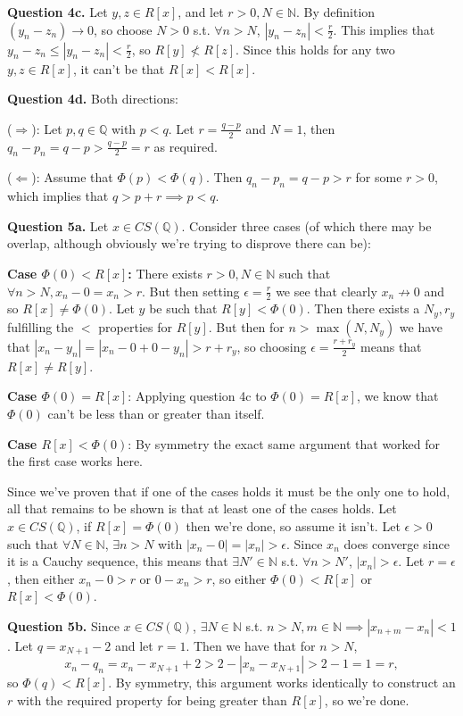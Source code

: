 \documentclass[letterpaper, reqno,11pt]{article}
\begin{document}
{\medskip\noindent\bf Question 4c.} Let $y,z\in R[x]$, and let $r>0,N\in \mathbb{N}$. By definition $(y_n-z_n)\to 0$, so choose $N>0$ s.t. $\forall n>N$, $|y_n-z_n|<\frac{r}{2}$. This implies that $y_n-z_n\leq |y_n-z_n|<\frac{r}{2}$, so $R[y]\not <R[z]$. Since this holds for any two $y,z\in R[x]$, it can't be that $R[x]<R[x]$.

{\medskip\noindent\bf Question 4d.} Both directions:

($\Rightarrow$): Let $p,q\in \mathbb{Q}$ with $p<q$. Let $r=\frac{q-p}{2}$ and $N=1$, then $q_n-p_n=q-p>\frac{q-p}{2}=r$ as required.

($\Leftarrow$): Assume that $\Phi(p)<\Phi(q)$. Then $q_n-p_n=q-p>r$ for some $r>0$, which implies that $q>p+r\implies p<q$.

\newpage\phantom{blabla}
\newpage

{\medskip\noindent\bf Question 5a.} Let $x\in CS(\mathbb{Q})$. Consider three cases (of which there may be overlap, although obviously we're trying to disprove there can be):

{\bf Case $\Phi(0)<R[x]$:} There exists $r>0,N\in \mathbb{N}$ such that $\forall n>N, x_n-0=x_n>r$. But then setting $\epsilon= \frac{r}{2}$ we see that clearly $x_n\not\to 0$ and so $R[x]\neq \Phi(0)$. Let $y$ be such that $R[y]<\Phi(0)$. Then there exists a $N_y,r_y$ fulfilling the $<$ properties for $R[y]$. But then for $n>\max(N,N_y)$ we have that $|x_n-y_n|=\left| x_n-0+0-y_n \right| >r+r_y$, so choosing $\epsilon= \frac{r+r_y}{2}$ means that $R[x]\neq R[y]$.

{\bf Case $\Phi(0)=R[x]$}: Applying question 4c to $\Phi(0)=R[x]$, we know that $\Phi(0)$ can't be less than or greater than itself.

{\bf Case $R[x]<\Phi(0)$}: By symmetry the exact same argument that worked for the first case works here.

\noindent Since we've proven that if one of the cases holds it must be the only one to hold, all that remains to be shown is that at least one of the cases holds. Let $x\in CS(\mathbb{Q})$, if $R[x]=\Phi(0)$ then we're done, so assume it isn't. Let $\epsilon>0$ such that $\forall N\in \mathbb{N}$, $\exists n>N$ with $\left| x_n-0 \right|=|x_n| >\epsilon$. Since $x_n$ does converge since it is a Cauchy sequence, this means that $\exists N'\in \mathbb{N}$ s.t. $\forall n>N'$, $|x_n|>\epsilon$. Let $r=\epsilon$, then either $x_n-0>r$ or $0-x_n>r$, so either $\Phi(0)<R[x]$ or $R[x]<\Phi(0)$.

{\medskip\noindent\bf Question 5b.} Since $x\in CS(\mathbb{Q})$, $\exists N\in \mathbb{N}$ s.t. $n>N,m\in \mathbb{N}\implies \left| x_{n+m}-x_n \right|<1$. Let $q=x_{N+1}-2$ and let $r=1$. Then we have that for $n>N$,
\[
x_n-q_n=x_n-x_{N+1}+2>2-\left| x_n-x_{N+1} \right| >2-1=1=r
,\]
so $\Phi(q)<R[x]$. By symmetry, this argument works identically to construct an $r$ with the required property for being greater than $R[x]$, so we're done.
\end{document}
